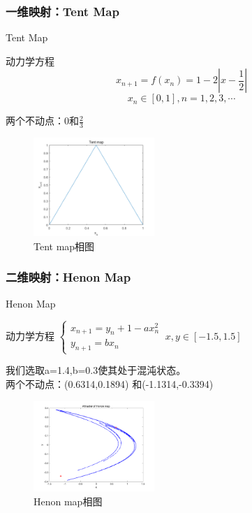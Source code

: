 \documentclass{beamer}
\begin{document}
		\subsubsection{一维映射：Tent Map}
		\begin{frame}{Tent Map}
		\begin{block}{动力学方程}
			$$x_{n+1}=f(x_n)=1-2|x-\frac{1}{2}|$$
			$$x_n\in [0,1], n=1,2,3,\cdots$$
		\end{block}
		两个不动点：0和$\frac{2}{3}$
		\begin{figure}
			\begin{minipage}{0.4\linewidth}
				\centering
				\includegraphics[width=1.8in]{figure/tent_phase}
				\caption{Tent map相图}
			\end{minipage}
		\end{figure}
		\end{frame}
		\subsubsection{二维映射：Henon Map}
		\begin{frame}{Henon Map}
		\begin{block}{动力学方程}
			\centering
			\begin{math}
			\begin{cases}
				x_{n+1}=y_n+1-ax_n^2\\
				y_{n+1}=bx_n
			\end{cases}\ x,y\in [-1.5,1.5]
			\end{math}
		\end{block}
		我们选取a=1.4,b=0.3使其处于混沌状态。\\
		两个不动点：(0.6314,0.1894)
和(-1.1314,-0.3394)
		\begin{figure}
			\begin{minipage}{0.4\linewidth}
				\centering
				\includegraphics[width=1.8in]{figure/henon_phase}
				\caption{Henon map相图}
			\end{minipage}
		\end{figure}
		\end{frame}
\end{document}

